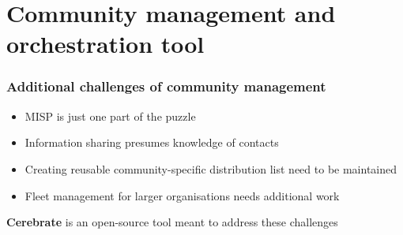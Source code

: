 \section{Community management and orchestration tool}
\begin{frame}
    \frametitle{Additional challenges of community management}
    \begin{itemize}
        \item MISP is just one part of the puzzle
        \item Information sharing presumes knowledge of contacts
        \item Creating reusable community-specific distribution list need to be maintained
        \item Fleet management for larger organisations needs additional work
    \end{itemize}
    \begin{center}
        \textbf{Cerebrate} is an open-source tool meant to address these challenges
    \end{center}
\end{frame}


